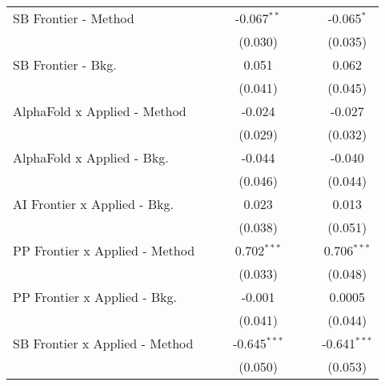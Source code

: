 \begin{tabular}{lcccccc}
   SB Frontier - Method           &             &               & -0.067$^{**}$  &               &               & -0.065$^{*}$\\   
                                  &             &               & (0.030)        &               &               & (0.035)\\   
   SB Frontier - Bkg.             &             &               & 0.051          &               &               & 0.062\\   
                                  &             &               & (0.041)        &               &               & (0.045)\\   
   AlphaFold x Applied - Method   &             &               & -0.024         &               &               & -0.027\\   
                                  &             &               & (0.029)        &               &               & (0.032)\\   
   AlphaFold x Applied - Bkg.     &             &               & -0.044         &               &               & -0.040\\   
                                  &             &               & (0.046)        &               &               & (0.044)\\   
   AI Frontier x Applied - Bkg.   &             &               & 0.023          &               &               & 0.013\\   
                                  &             &               & (0.038)        &               &               & (0.051)\\   
   PP Frontier x Applied - Method &             &               & 0.702$^{***}$  &               &               & 0.706$^{***}$\\   
                                  &             &               & (0.033)        &               &               & (0.048)\\   
   PP Frontier x Applied - Bkg.   &             &               & -0.001         &               &               & 0.0005\\   
                                  &             &               & (0.041)        &               &               & (0.044)\\   
   SB Frontier x Applied - Method &             &               & -0.645$^{***}$ &               &               & -0.641$^{***}$\\   
                                  &             &               & (0.050)        &               &               & (0.053)\\   

\end{tabular}
